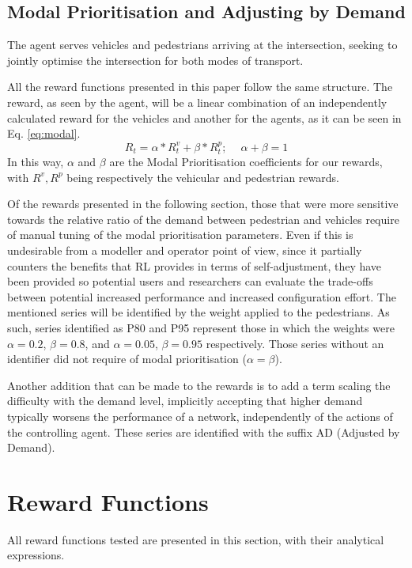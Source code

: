 \documentclass[conference]{IEEEtran}
\begin{document}
\subsection{Modal Prioritisation and Adjusting by Demand}
The agent serves vehicles and pedestrians arriving at the intersection, seeking to jointly optimise the intersection for both modes of transport.

All the reward functions presented in this paper follow the same structure.
The reward, as seen by the agent, will be a linear combination of an independently calculated reward for the vehicles and another for the agents, as it can be seen in Eq. \ref{eq:modal}.
\begin{equation}
R_t = \alpha * R^v_t + \beta * R^p_t;\,\,\,\,\,\,\ \alpha+\beta = 1
\label{eq:modal}
\end{equation}
In this way, $\alpha$ and $\beta$ are the Modal Prioritisation coefficients for our rewards, with $R^v, R^p$ being respectively the vehicular and pedestrian rewards.

Of the rewards presented in the following section, those that were more sensitive towards the relative ratio of the demand between pedestrian and vehicles require of manual tuning of the modal prioritisation parameters.
Even if this is undesirable from a modeller and operator point of view, since it partially counters the benefits that RL provides in terms of self-adjustment, they have been provided so potential users and researchers can evaluate the trade-offs between potential increased performance and increased configuration effort.
The mentioned series will be identified by the weight applied to the pedestrians.
As such, series identified as P80 and P95 represent those in which the weights were $\alpha=0.2$, $\beta=0.8$, and $\alpha=0.05$, $\beta=0.95$ respectively. 
Those series without an identifier did not require of modal prioritisation ($\alpha = \beta$).

Another addition that can be made to the rewards is to add a term scaling the difficulty with the demand level, implicitly accepting that higher demand typically worsens the performance of a network, independently of the actions of the controlling agent.
These series are identified with the suffix AD (Adjusted by Demand).
\section{Reward Functions}
\label{rewards}
All reward functions tested are presented in this section, with their analytical expressions.
\end{document}

